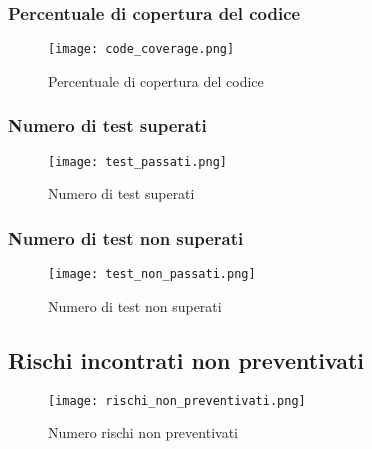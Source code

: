 \documentclass[../piano-di-qualifica.tex]{subfiles}
\begin{document}
\subsubsection{Percentuale di copertura del codice}%
\label{subs:percentuale_cop_codice}
\begin{figure}[H]
  \centering
  \texttt{[image: code\_coverage.png]}%
  \caption{Percentuale di copertura del codice}%
  \label{fig:percentuale_cop_codice}%
\end{figure}

\subsubsection{Numero di test superati}%
\label{subs:test_non_superati}
\begin{figure}[H]
  \centering
  \texttt{[image: test\_passati.png]}%
  \caption{Numero di test superati}%
  \label{fig:test_non_superati}%
\end{figure}

\subsubsection{Numero di test non superati}%
\label{subs:test_superati}
\begin{figure}[H]
  \centering
  \texttt{[image: test\_non\_passati.png]}%
  \caption{Numero di test non superati}%
  \label{fig:test_superati}%
\end{figure}





\subsection{Rischi incontrati non preventivati}%
\label{sub:rischi_non_preventivati_report}

\begin{figure}[H]
  \centering
  \texttt{[image: rischi\_non\_preventivati.png]}%
  \caption{Numero rischi non preventivati}%
  \label{fig:rischi_non_preventivati}%
\end{figure}
\end{document}
